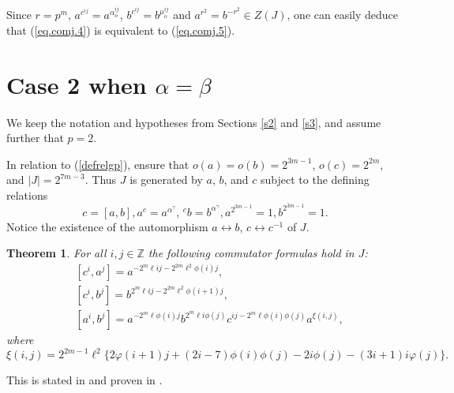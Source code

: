 \documentclass{amsart}
\newtheorem{theorem}{Theorem}[section]
\theoremstyle{definition}
\theoremstyle{remark}
\newcommand \Z{{\mathbb Z}}
\begin{document}
{Since $r=p^m$, $a^{c^{ij}}=a^{\alpha_o^{ij}}$, $b^{c^{ij}}=b^{\mu_o^{ij}}$ and $a^{r^2}=b^{-r^2}\in Z(J)$,
one can easily deduce that (\ref{eq.comj.4}) is equivalent to (\ref{eq.comj.5}).








\section{Case 2 when $\alpha=\beta$}\label{s5}

We keep the notation and hypotheses from Sections \ref{s2} and \ref{s3}, and assume further 
that $p=2$. 

In relation to (\ref{defrelgp}), \cite[Theorem 7.1 and Proposition 7.2]{MS} ensure that $o(a)=o(b)=2^{3m-1}$,
$o(c)=2^{2m}$, and $|J|=2^{7m-3}$. 
Thus $J$ is generated by  $a$, $b$, and $c$ subject to the defining relations
\begin{equation}
\label{relgpdos}
c=[a,b], a^{c}=a^{\alpha^\gamma},\, {}^{c} b=b^{\alpha^\gamma}, a^{2^{3m-1}}=1, b^{2^{3m-1}}=1.
\end{equation}
Notice the existence of the automorphism $a\leftrightarrow b$, $c\leftrightarrow c^{-1}$ of $J$.


\begin{theorem}\label{fern}
    For all $i,j\in\Z$ the following commutator formulas hold in $J$:
    \begin{align}
        &[c^i,a^j]
        = a^{-2^m\ell ij - 2^{2m}\ell^2\phi(i)j},\label{eq.fer}\\
        &[c^i,b^j]
        = b^{2^m\ell ij - 2^{2m}\ell^2\phi(i+1)j},\label{eq.fer2}\\
        &[a^i,b^j]
        =a^{-2^m\ell\phi(i)j} b^{2^m\ell i\phi(j)} c^{ij - 2^m\ell\phi(i)\phi(j)} a^{\xi(i,j)},\label{eq.fer3}
				\end{align}
    where 
    \[
    \xi(i,j)= 2^{2m-1}\ell^2\{2\varphi(i+1)j + (2i-7)\phi(i)\phi(j) - 2i\phi(j) - (3i+1)i\varphi(j)\}.
    \]
		\end{theorem}

This is stated in \cite[Theorem 3.1]{MS2} and proven in  \cite[Theorem 8.1]{MS2}.

}
\end{document}
